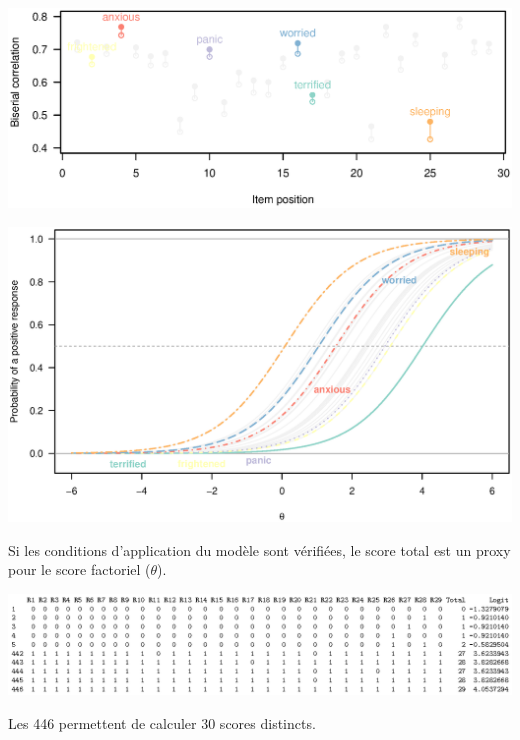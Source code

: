 
{\centering \includegraphics[width=.8\textwidth]{figs/anxiety_biserial.eps}\par}


{\centering \includegraphics[width=.7\textwidth]{figs/anxiety_onepl.eps}\par}


Si les conditions d'application du modèle sont vérifiées, le score total est un
 proxy pour le score factoriel ($\theta$).

{\centering \includegraphics[width=\textwidth]{figs/anxiety_resp_patt.eps}\par}

Les 446  permettent de calculer 30 scores distincts.


